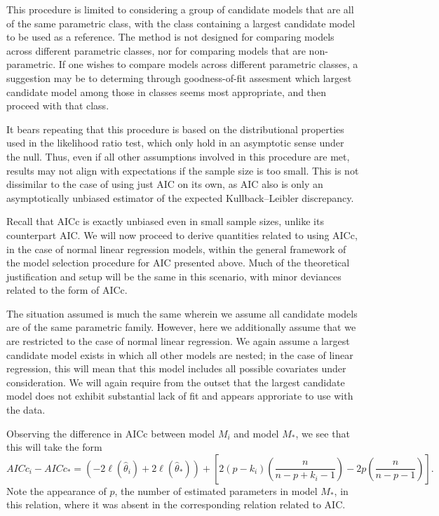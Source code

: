 		This procedure is limited to considering a group of candidate models that are all of the same parametric class, with the class containing a largest candidate
		model to be used as a reference. The method is not designed for comparing models across different parametric classes, nor for comparing models that are non-parametric.
		If one wishes to compare models across different parametric classes, a suggestion may be to determing through goodness-of-fit assesment which largest candidate model
		among those in classes seems most appropriate, and then proceed with that class.

		It bears repeating that this procedure is based on the distributional properties used in the likelihood ratio test, which only hold in an asymptotic sense under the
		null. Thus, even if all other assumptions involved in this procedure are met, results may not align with expectations if the sample size is too small. This is not
		dissimilar to the case of using just AIC on its own, as AIC also is only an asymptotically unbiased estimator of the expected Kullback–Leibler discrepancy.

		Recall that AICc is exactly unbiased even in small sample sizes, unlike its counterpart AIC. We will now proceed to derive quantities related to using AICc,
		in the case of normal linear regression models, within the general framework of the model selection procedure for AIC presented above. Much of the theoretical
		justification and setup will be the same in this scenario, with minor deviances related to the form of AICc.

		The situation assumed is much the same wherein we assume all candidate models are of the same parametric family. However, here we additionally assume that we are
		restricted to the case of normal linear regression. We again assume a largest candidate model exists in which all other models are nested; in the case of linear
		regression, this will mean that this model includes all possible covariates under consideration. We will again require from the outset that the largest candidate
		model does not exhibit substantial lack of fit and appears approriate to use with the data.

		Observing the difference in AICc between model $M_i$ and model $M_*$, we see that
		this will take the form
		\begin{equation}
			AICc_i - AICc_* = (-2 \ell (\hat{\theta}_i) + 2 \ell (\hat{\theta}_*) ) + \left[ 2(p-k_i) \left( \frac{n}{n-p+k_i-1} \right) - 2p \left( \frac{n}{n-p-1} \right) \right] .
		\end{equation}
		Note the appearance of $p$, the number of estimated parameters in model $M_*$, in this relation, where it was absent in the corresponding relation related to AIC.

